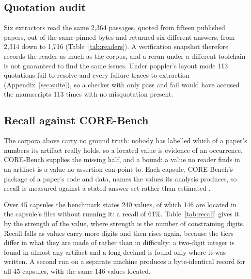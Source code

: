 \documentclass{article}
\begin{document}
\subsection{Quotation audit}
\label{sec:quote}

Six extractors read the same 2{,}364 passages, quoted from fifteen published papers, out of the same pinned bytes and returned six
different answers, from 2{,}314 down to 1{,}716 (Table~\ref{tab:readers}). A verification snapshot therefore records the
reader as much as the corpus, and a rerun under a different toolchain is not guaranteed to find
the same issues. Under poppler's layout mode 113 quotations fail to resolve and every failure
traces to extraction (Appendix~\ref{sec:suite}), so a checker with only pass and fail would have
accused the manuscripts 113 times with no misquotation present.

\subsection{Recall against CORE-Bench}

The corpora above carry no ground truth: nobody has labelled which of a paper's numbers its
artifact really holds, so a located value is evidence of an occurrence. CORE-Bench supplies the missing half, and a bound: a value no reader finds in an artifact is a
value no assertion can point to. Each capsule, CORE-Bench's package of a paper's code and
data, names the values its analysis produces, so recall is measured against a stated answer set
rather than estimated \citep{siegel2024corebench}.

Over 45 capsules the benchmark states 240 values, of which 146 are located in the capsule's files
without running it: a recall of 61\%. Table~\ref{tab:recall} gives it by the strength of the value, where strength is the
number of constraining digits. Recall falls as values carry more digits and then rises again,
because the tiers differ in what they are made of rather than in difficulty: a two-digit
integer is found in almost any artifact and a long decimal is found only where it was written.
A second run on a separate machine produces a byte-identical record for all 45 capsules, with the
same 146 values located.
\end{document}
